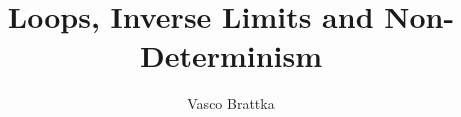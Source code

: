 \documentclass{lmcs}
\title{Loops, Inverse Limits and Non-Determinism}
\author[V.~Brattka]{Vasco Brattka\lmcsorcid{0000-0003-4664-2183}}
\begin{document}
 



\def\AA{{\mathcal A}}
\def\BB{{\mathcal B}}
\def\CC{{\mathcal C}}
\def\DD{{\mathcal D}}
\def\EE{{\mathcal E}}
\def\FF{{\mathcal F}}
\def\GG{{\mathcal G}}
\def\HH{{\mathcal H}}
\def\II{{\mathcal I}}
\def\JJ{{\mathcal J}}
\def\KK{{\mathcal K}}
\def\LL{{\mathcal L}}
\def\MM{{\mathcal M}}
\def\NN{{\mathcal N}}
\def\OO{{\mathcal O}}
\def\PP{{\mathcal P}}
\def\QQ{{\mathcal Q}}
\def\RR{{\mathcal R}}
\def\SS{{\mathcal S}}
\def\TT{{\mathcal T}}
\def\UU{{\mathcal U}}
\def\VV{{\mathcal V}}
\def\WW{{\mathcal W}}
\def\XX{{\mathcal X}}
\def\YY{{\mathcal Y}}
\def\ZZ{{\mathcal Z}}


\def\bA{{\mathbf A}}
\def\bB{{\mathbf B}}
\def\bC{{\mathbf C}}
\def\bD{{\mathbf D}}
\def\bE{{\mathbf E}}
\def\bF{{\mathbf F}}
\def\bG{{\mathbf G}}
\def\bH{{\mathbf H}}
\def\bI{{\mathbf I}}
\def\bJ{{\mathbf J}}
\def\bK{{\mathbf K}}
\def\bL{{\mathbf L}}
\def\bM{{\mathbf M}}
\def\bN{{\mathbf N}}
\def\bO{{\mathbf O}}
\def\bP{{\mathbf P}}
\def\bQ{{\mathbf Q}}
\def\bR{{\mathbf R}}
\def\bS{{\mathbf S}}
\def\bT{{\mathbf T}}
\def\bU{{\mathbf U}}
\def\bV{{\mathbf V}}
\def\bW{{\mathbf W}}
\def\bX{{\mathbf X}}
\def\bY{{\mathbf Y}}
\def\bZ{{\mathbf Z}}


\def\IB{{\mathbb{B}}}
\def\IC{{\mathbb{C}}}
\def\IF{{\mathbb{F}}}
\def\IN{{\mathbb{N}}}
\def\IP{{\mathbb{P}}}
\def\IQ{{\mathbb{Q}}}
\def\IR{{\mathbb{R}}}
\def\IS{{\mathbb{S}}}
\def\IT{{\mathbb{T}}}
\def\IZ{{\mathbb{Z}}}

\def\IIB{{\mathbb{\mathbf B}}}
\def\IIC{{\mathbb{\mathbf C}}}
\def\IIN{{\mathbb{\mathbf N}}}
\def\IIQ{{\mathbb{\mathbf Q}}}
\def\IIR{{\mathbb{\mathbf R}}}
\def\IIZ{{\mathbb{\mathbf Z}}}





\def\ELSE{\quad\mbox{else}\quad}
\def\WITH{\quad\mbox{with}\quad}
\def\FOR{\quad\mbox{for}\quad}
\def\AND{\;\mbox{and}\;}
\def\OR{\;\mbox{or}\;}

\def\To{\longrightarrow}
\def\TO{\Longrightarrow}
\def\In{\subseteq}
\def\sm{\setminus}
\def\Inneq{\In_{\!\!\!\!/}}
\def\dmin{\mathop{\dot{-}}}
\def\splus{\oplus}
\def\SEQ{\triangle}
\def\DIV{\uparrow}
\def\INV{\leftrightarrow}
\def\SET{\Diamond}
\end{document}
